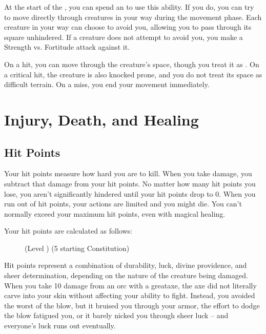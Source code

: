         \begin{ability}{}
            At the start of the , you can spend an  to use this ability.
            If you do, you can try to move directly through creatures in your way during the movement phase.
            Each creature in your way can choose to avoid you, allowing you to pass through its square unhindered.
            If a creature does not attempt to avoid you, you make a Strength vs. Fortitude attack against it.

            On a hit, you can move through the creature's space, though you treat it as .
            On a critical hit, the creature is also knocked prone, and you do not treat its space as difficult terrain.
            On a miss, you end your movement immediately.
        \end{ability}

\section{Injury, Death, and Healing}\label{Injury, Death, and Healing}

    \subsection{Hit Points}\label{Hit Points}
        Your hit points measure how hard you are to kill.
        When you take damage, you subtract that damage from your hit points.
        No matter how many hit points you lose, you aren't significantly hindered until your hit points drop to 0.
        When you run out of hit points, your actions are limited and you might die.
        You can't normally exceed your maximum hit points, even with magical healing.

        Your hit points are calculated as follows:

        \begin{figure}[h]
            \centering (Level ) \x (5 \add starting Constitution)
        \end{figure}

         Hit points represent a combination of durability, luck, divine providence, and sheer determination, depending on the nature of the creature being damaged.
        When you take 10 damage from an orc with a greataxe, the axe did not literally carve into your skin without affecting your ability to fight.
        Instead, you avoided the worst of the blow, but it bruised you through your armor, the effort to dodge the blow fatigued you, or it barely nicked you through sheer luck -- and everyone's luck runs out eventually.

